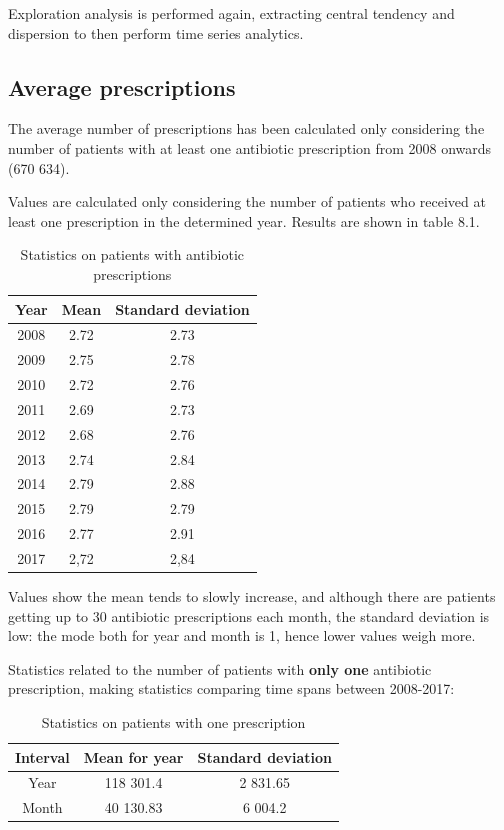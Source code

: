 Exploration analysis is performed again, extracting central tendency and dispersion to then perform time series analytics.

\subsection{Average prescriptions}
The average number of prescriptions has been calculated only considering the number of patients with at least one antibiotic prescription from 2008 onwards (670 634). 

Values are calculated only considering the number of patients who received at least one prescription in the determined year. Results are shown in table 8.1.

\begin{table}
	\centering
	\begin{tabular}{c|c|c}
		\textbf{Year} & \textbf{Mean} & \textbf{Standard deviation} \\
		\hline
		2008 & 2.72 & 2.73 \\
		\hline
		2009 & 2.75 & 2.78 \\
		\hline
		2010 & 2.72 &  2.76 \\
		\hline
		2011 & 2.69 &  2.73 \\
		\hline
		2012 & 2.68 & 2.76 \\
		\hline
		2013 & 2.74 & 2.84 \\
		\hline
		2014 & 2.79 & 2.88 \\
		\hline
		2015 & 2.79 & 2.79 \\
		\hline
		2016 & 2.77 & 2.91 \\
		\hline
		2017 & 2,72 & 2,84 \\
	\end{tabular}
	\caption{\small Statistics on patients with antibiotic prescriptions}
	\label{avgant}
\end{table}

Values show the mean tends to slowly increase, and although there are patients getting up to 30 antibiotic prescriptions each month, the standard deviation is low: the mode both for year and month is 1, hence lower values weigh more.

Statistics related to the number of patients with \textbf{only one} antibiotic prescription, making statistics comparing time spans between 2008-2017:
\begin{table}[h]
	\centering
	\begin{tabular}{c|c|c}
		\textbf{Interval} & \textbf{Mean for year} & \textbf{Standard deviation} \\
		\hline
		Year & 118 301.4 & 2 831.65 \\
		\hline
		Month & 40 130.83 & 6 004.2 \\
	\end{tabular}
\caption{\small Statistics on patients with one prescription}
\end{table}

